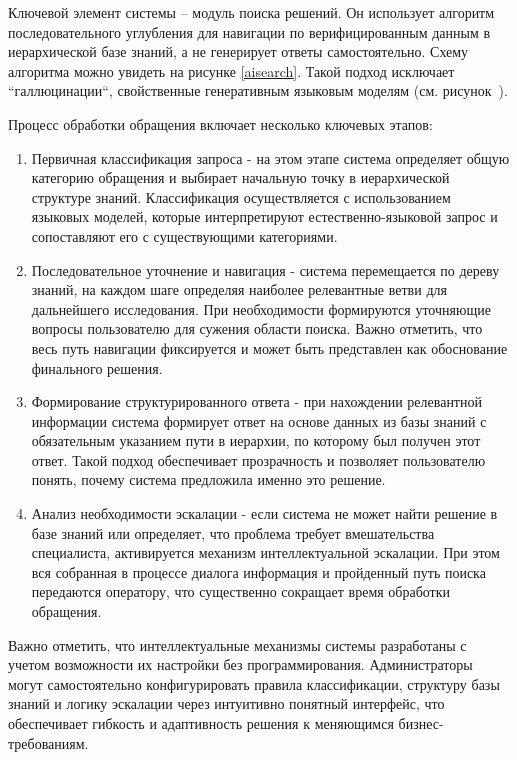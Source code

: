 Ключевой элемент системы – модуль поиска решений. Он использует алгоритм последовательного углубления для навигации по верифицированным данным в иерархической базе знаний, а не генерирует ответы самостоятельно. Схему алгоритма можно увидеть на рисунке \ref{aisearch}. Такой подход исключает ``галлюцинации``, свойственные генеративным языковым моделям (см. рисунок~).


Процесс обработки обращения включает несколько ключевых этапов:
\begin{enumerate}[label=\arabic*]
    \item Первичная классификация запроса - на этом этапе система определяет общую категорию обращения и выбирает начальную точку в иерархической структуре знаний. Классификация осуществляется с использованием языковых моделей, которые интерпретируют естественно-языковой запрос и сопоставляют его с существующими категориями.
    \item Последовательное уточнение и навигация - система перемещается по дереву знаний, на каждом шаге определяя наиболее релевантные ветви для дальнейшего исследования. При необходимости формируются уточняющие вопросы пользователю для сужения области поиска. Важно отметить, что весь путь навигации фиксируется и может быть представлен как обоснование финального решения.
    \item Формирование структурированного ответа - при нахождении релевантной информации система формирует ответ на основе данных из базы знаний с обязательным указанием пути в иерархии, по которому был получен этот ответ. Такой подход обеспечивает прозрачность и позволяет пользователю понять, почему система предложила именно это решение.
    \item Анализ необходимости эскалации - если система не может найти решение в базе знаний или определяет, что проблема требует вмешательства специалиста, активируется механизм интеллектуальной эскалации. При этом вся собранная в процессе диалога информация и пройденный путь поиска передаются оператору, что существенно сокращает время обработки обращения.
\end{enumerate}

Важно отметить, что интеллектуальные механизмы системы разработаны с учетом возможности их настройки без программирования. Администраторы могут самостоятельно конфигурировать правила классификации, структуру базы знаний и логику эскалации через интуитивно понятный интерфейс, что обеспечивает гибкость и адаптивность решения к меняющимся бизнес-требованиям.

